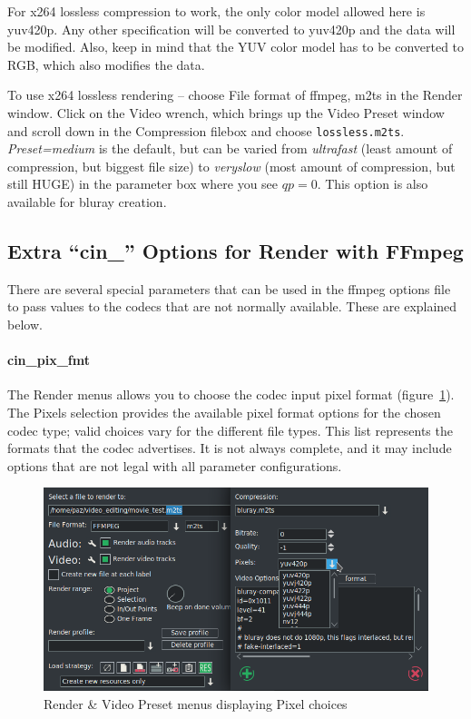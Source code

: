 For x264 lossless compression to work, the only color model allowed here is yuv420p.  Any other specification will be converted to yuv420p and the data will be modified.  Also, keep in mind that the YUV color model has to be converted to RGB, which also modifies the data.

To use x264 lossless rendering -- choose File format of ffmpeg, m2ts in the Render window.  Click on the Video wrench, which brings up the Video Preset window and scroll down in the Compression filebox and choose \texttt{lossless.m2ts}.  \textit{Preset=medium} is the default, but can be varied from \textit{ultrafast} (least amount of compression, but biggest file size) to \textit{veryslow} (most amount of compression, but still HUGE) in the parameter box where you see $qp=0$.  This option is also available for bluray creation.

\subsection{Extra “cin\_” Options for Render with FFmpeg}%
\label{sub:extra_cin_option_ffmpeg}

There are several special parameters that can be used in the ffmpeg options file to pass values to the codecs that are not normally available.  These are explained below.

\paragraph{cin\_pix\_fmt} The Render menus allows you to choose the codec input pixel format (figure~\ref{fig:yuv420}).  The Pixels selection provides the available pixel format options for the chosen codec type; valid choices vary for the different file types.  This list represents the formats that the codec advertises.  It is not always complete, and it may include options that are not legal with all parameter configurations.

\begin{figure}[htpb]
    \centering
    \includegraphics[width=0.6\linewidth]{images/yuv420.png}
    \caption{Render \& Video Preset menus displaying Pixel choices}
    \label{fig:yuv420}
\end{figure}

